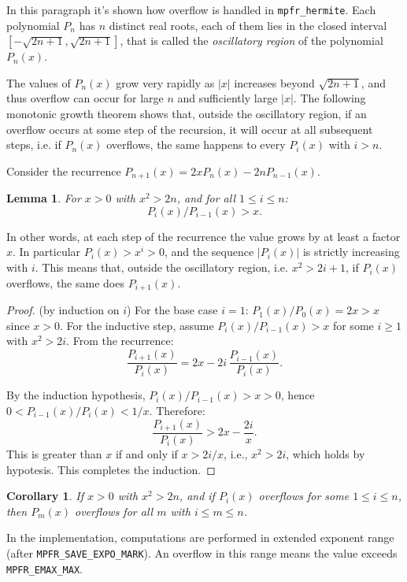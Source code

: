 \documentclass[12pt]{amsart}
\newtheorem{lemma}{Lemma}
\newtheorem{corollary}{Corollary}
\begin{document}
In this paragraph it's shown how overflow is handled in \texttt{mpfr\_hermite}.
Each polynomial $P_n$ has $n$ distinct real roots, each of them lies in the
closed interval $[-\sqrt{2n+1}, \sqrt{2n+1}]$, that is called the
\emph{oscillatory region} of the polynomial $P_n(x)$.

The values of $P_n(x)$ grow very rapidly as $|x|$ increases beyond $\sqrt{2n+1}$,
and thus overflow can occur for large $n$ and sufficiently large $|x|$.
The following monotonic growth theorem shows that, outside the oscillatory region,
if an overflow occurs at some step of the recursion, it will occur at
all subsequent steps, i.e. if $P_n(x)$ overflows, the same happens to every
$P_i(x)$ with $i > n$.

\noindent Consider the recurrence $P_{n+1}(x) = 2x P_n(x) - 2n P_{n-1}(x)$.

\begin{lemma}
For $x > 0$ with $x^2 > 2n$, and for all $1 \le i \le n$:
\[
  P_i(x) / P_{i-1}(x) > x.
\]
\end{lemma}

In other words, at each step of the recurrence the value grows by at
least a factor $x$. In particular $P_i(x) > x^i > 0$, and the sequence
$|P_i(x)|$ is strictly increasing with $i$. This means that, outside
the oscillatory region, i.e. $x^2 > 2i + 1$, if $P_i(x)$ overflows,
the same does $P_{i+1}(x)$.

\begin{proof}{(by induction on $i$)}
For the base case $i = 1$: $P_1(x)/P_0(x) = 2x > x$ since $x > 0$.
For the inductive step, assume $P_i(x)/P_{i-1}(x) > x$ for some
$i \ge 1$ with $x^2 > 2i$.
From the recurrence:
\[
  \frac{P_{i+1}(x)}{P_i(x)} = 2x - 2i \, \frac{P_{i-1}(x)}{P_i(x)}.
\]

By the induction hypothesis, $P_i(x)/P_{i-1}(x) > x > 0$, hence
$0 < P_{i-1}(x)/P_i(x) < 1/x$. Therefore:
\[
  \frac{P_{i+1}(x)}{P_i(x)} > 2x - \frac{2i}{x}.
\]
This is greater than $x$ if and only if $x > 2i/x$, i.e., $x^2 > 2i$,
which holds by hypotesis. This completes the induction.
\end{proof}

\begin{corollary}
If $x > 0$ with $x^2 > 2n$, and if $P_i(x)$ overflows for some
$1 \le i \le n$, then $P_m(x)$ overflows for all $m$ with
$i \le m \le n$.
\end{corollary}

In the implementation, computations are performed in extended exponent
range (after \texttt{MPFR\_SAVE\_EXPO\_MARK}). An overflow in this range
means the value exceeds \texttt{MPFR\_EMAX\_MAX}.
\end{document}
